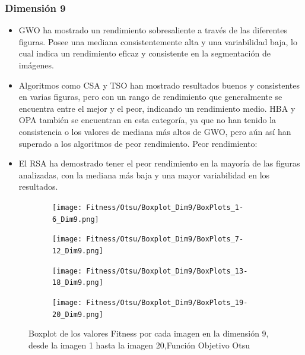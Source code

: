 \documentclass[conference]{IEEEtran}
\begin{document}
\subsubsection{Dimensión 9}
\begin{itemize}
	\item GWO ha mostrado un rendimiento sobresaliente a través de las diferentes figuras. Posee una mediana consistentemente alta y una variabilidad baja, lo cual indica un rendimiento eficaz y consistente en la segmentación de imágenes.
	
	\item Algoritmos como CSA y TSO han mostrado resultados buenos y consistentes en varias figuras, pero con un rango de rendimiento que generalmente se encuentra entre el mejor y el peor, indicando un rendimiento medio.
	HBA y OPA también se encuentran en esta categoría, ya que no han tenido la consistencia o los valores de mediana más altos de GWO, pero aún así han superado a los algoritmos de peor rendimiento.
	Peor rendimiento:
	
	\item El RSA ha demostrado tener el peor rendimiento en la mayoría de las figuras analizadas, con la mediana más baja y una mayor variabilidad en los resultados.
	
\end{itemize}
\begin{figure}
	\centering
	
	\begin{subfigure}{0.4\textwidth}
		\texttt{[image: Fitness/Otsu/Boxplot\_Dim9/BoxPlots\_1-6\_Dim9.png]}
	\end{subfigure}
	
	\begin{subfigure}{0.4\textwidth}
		\texttt{[image: Fitness/Otsu/Boxplot\_Dim9/BoxPlots\_7-12\_Dim9.png]}
	\end{subfigure}
	\begin{subfigure}{0.4\textwidth}
		\texttt{[image: Fitness/Otsu/Boxplot\_Dim9/BoxPlots\_13-18\_Dim9.png]}
	\end{subfigure}
	\begin{subfigure}{0.4\textwidth}
		\texttt{[image: Fitness/Otsu/Boxplot\_Dim9/BoxPlots\_19-20\_Dim9.png]}
		\vspace{-120pt} %
	\end{subfigure}
	\caption{Boxplot de los valores Fitness por cada imagen en la dimensión 9, desde la imagen 1 hasta la imagen 20,Función Objetivo Otsu}
	\label{fig:imagenes}    
\end{figure}
\end{document}
